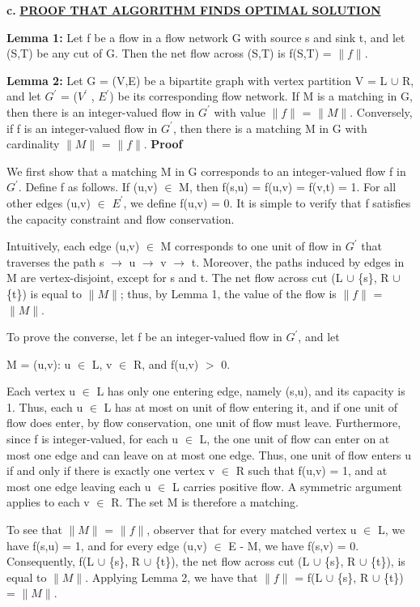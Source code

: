\documentclass[11pt]{csc_assignment}
\begin{document}
\begin{description}
\textbf{c.} \underline{\textbf{PROOF THAT ALGORITHM FINDS OPTIMAL SOLUTION}}

\textbf{Lemma 1:}
Let f be a flow in a flow network G with source s and sink t, and let (S,T) be any cut of G. Then the net flow across (S,T) is f(S,T) = $\|f\|$.

\textbf{Lemma 2:}
Let G = (V,E) be a bipartite graph with vertex partition V = L $\cup$ R, and let $G^{'}$ = ($V^{'}$ , $E^{'}$) be its corresponding flow network. If M is a matching in G, then there is an integer-valued flow in $G^{'}$ with value $\|f\|$ = $\|M\|$. Conversely, if f is an integer-valued flow in $G^{'}$, then there is a matching M in G with cardinality $\|M\|$ = $\|f\|$.
\clearpage
\textbf{Proof}

We first show that a matching M in G corresponds to an integer-valued flow f in $G^{'}$. Define f as follows. If (u,v) $\in$ M, then f(s,u) = f(u,v) = f(v,t) = 1. For all other edges (u,v) $\in$ $E^{'}$, we define f(u,v) = 0. It is simple to verify that f satisfies the capacity constraint and flow conservation.

Intuitively, each edge (u,v) $\in$ M corresponds to one unit of flow in $G^{'}$ that traverses the path s $\rightarrow$ u $\rightarrow$ v $\rightarrow$ t. Moreover, the paths induced by edges in M are vertex-disjoint, except for s and t. The net flow across cut (L $\cup$ \{s\}, R $\cup$ \{t\}) is equal to $\|M\|$; thus, by Lemma 1, the value of the flow is $\|f\|$ = $\|M\|$.

To prove the converse, let f be an integer-valued flow in $G^{'}$, and let

M = {(u,v): u $\in$ L, v $\in$ R, and f(u,v) $>$ 0}.

Each vertex u $\in$ L has only one entering edge, namely (s,u), and its capacity is 1. Thus, each u $\in$ L has at most on unit of flow entering it, and if one unit of flow does enter, by flow conservation, one unit of flow must leave. Furthermore, since f is integer-valued, for each u $\in$ L, the one unit of flow can enter on at most one edge and can leave on at most one edge. Thus, one unit of flow enters u if and only if there is exactly one vertex v $\in$ R such that f(u,v) = 1, and at most one edge leaving each u $\in$ L carries positive flow. A symmetric argument applies to each v $\in$ R. The set M is therefore a matching.

To see that $\|M\|$ = $\|f\|$, observer that for every matched vertex u $\in$ L, we have f(s,u) = 1, and for every edge (u,v) $\in$ E - M, we have f(s,v) = 0. Consequently, f(L $\cup$ \{s\}, R $\cup$ \{t\}), the net flow across cut (L $\cup$ \{s\}, R $\cup$ \{t\}), is equal to $\|M\|$. Applying Lemma 2, we have that $\|f\|$ = f(L $\cup$ \{s\}, R $\cup$ \{t\}) = $\|M\|$.


\end{description}
\end{document}
